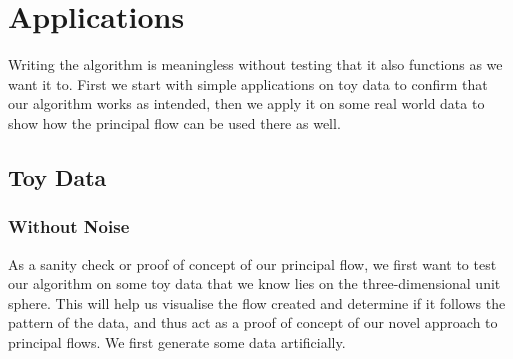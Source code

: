 \documentclass[12pt]{report}
\begin{document}
\chapter{Applications}
Writing the algorithm is meaningless without testing that it also functions 
as we want it to. First we start with simple applications on toy data to confirm that 
our algorithm works as intended, then we apply it on some real world data to show
how the principal flow can be used there as well.

\section{Toy Data}

\subsection{Without Noise}

As a sanity check or proof of concept of our principal flow, 
we first want to test our algorithm on some toy data that we know 
lies on the three-dimensional unit sphere. This will help us visualise the flow created
and determine if it follows the pattern of the data, 
and thus act as a proof of concept of
our novel approach to principal flows. 
We first generate some data artificially.
\end{document}
